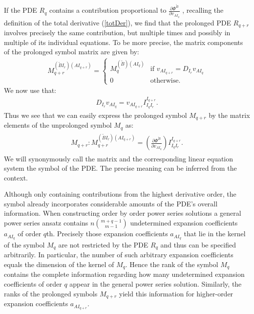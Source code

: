 If the PDE $R_q$ contains a contribution proportional to $\frac{\partial \Phi^{\tilde{B}}}{\partial v_{AI_q}}$ , recalling the definition of the total derivative (\ref{totDer}), we find that the prolonged PDE $R_{q+r}$ involves precisely the same contribution, but multiple times and possibly in multiple of its individual equations. 
To be more precise, the matrix components of the prolonged symbol matrix are given by:
\begin{align}
M_{q+r}^{(\tilde{B}I_r) (AI_{q+r})} = 
\begin{cases}
M_q^{(\tilde{B}) (AI_q)}  & \text{if \ \ }  
    v_{AI_{q+r}} = D_{I_r} v_{AI_q} \\
0 & \text{otherwise}.
\end{cases}
\end{align} 
We now use that: 
\begin{align}
    D_{I_r}v_{AI_q} = v_{AI_{q+r}}I_{I_q I_r}^{I_{q+r}}.
\end{align}
Thus we see that we can easily express the prolonged symbol $M_{q+r}$ by the matrix elements of the unprolonged symbol $M_q$ as:
\begin{align}
    \begin{aligned}
    M_{q+r} : M_{q+r} ^{(\tilde{B}I_r) (AI_{q+r})}  = \left ( \frac{\partial \Phi^{\tilde{B}}}{\partial v_{AI_q}} \right ) I_{I_q I_r}^{I_{q+r}} .
    \end{aligned}
\end{align}
We will synonymously call the matrix and the corresponding linear equation system the symbol of the PDE. The precise meaning can be inferred from the context. 


Although only containing contributions from the highest derivative order, the symbol already incorporates considerable amounts of the PDE's overall information.
When constructing order by order power series solutions
a general power series ansatz contains
$n\binom{m+q-1}{m-1}$ undetermined expansion coefficients $a_{AI_q}$ of order $q$th. 
Precisely those expansion coefficients $a_{AI_q}$ that lie in the kernel of the symbol $M_q$ are not restricted by the PDE $R_q$ and thus can be specified arbitrarily. In particular, the number of such arbitrary expansion coefficients equals the dimension of the kernel of $M_q$. 
Hence the rank of the symbol $M_q$ contains the complete information regarding how many undetermined expansion coefficients of order $q$ appear in the general power series solution.
Similarly, the ranks of the prolonged symbols $M_{q+r}$ yield this information for higher-order expansion coefficients $a_{AI_{q+r}}$.

